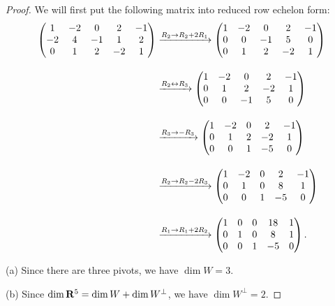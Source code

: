 \documentclass[10pt,twoside,openany]{memoir}
\begin{document}
    {\color{blue} \begin{proof}
        We will first put the following matrix into reduced row echelon form:
            \begin{equation*}
            \begin{split}
                \left( \begin{matrix} 1 & -2 & 0 & 2 & -1 \\ -2 & 4 & -1 & 1 & 2 \\ 0 & 1 & 2 & -2 & 1 \end{matrix} \right)
                & \xrightarrow{R_2 \to R_2 + 2R_1}
                \left( \begin{matrix} 1 & -2 & 0 & 2 & -1 \\ 0 & 0 & -1 & 5 & 0 \\ 0 & 1 & 2 & -2 & 1 \end{matrix} \right) \\[1em]
                & \xrightarrow{R_2 \leftrightarrow R_3}
                \left( \begin{matrix} 1 & -2 & 0 & 2 & -1 \\ 0 & 1 & 2 & -2 & 1 \\ 0 & 0 & -1 & 5 & 0 \end{matrix} \right) \\[1em]
                & \xrightarrow{R_3 \to -R_3}
                \left( \begin{matrix} 1 & -2 & 0 & 2 & -1 \\ 0 & 1 & 2 & -2 & 1 \\ 0 & 0 & 1 & -5 & 0 \end{matrix} \right) \\[1em]
                & \xrightarrow{R_2 \to R_2 - 2R_3}
                \left( \begin{matrix} 1 & -2 & 0 & 2 & -1 \\ 0 & 1 & 0 & 8 & 1 \\ 0 & 0 & 1 & -5 & 0 \end{matrix} \right) \\[1em]
                & \xrightarrow{R_1 \to R_1 + 2R_2}
                \left( \begin{matrix} 1 & 0 & 0 & 18 & 1 \\ 0 & 1 & 0 & 8 & 1 \\ 0 & 0 & 1 & -5 & 0 \end{matrix} \right).
            \end{split}
            \end{equation*}

        (a) Since there are three pivots, we have $\dim W = 3$.

        (b) Since $\dim \mathbf{R}^5 = \dim W +\dim W^\perp$, we have $\dim W^\perp = 2$.


\end{proof}}
\end{document}
